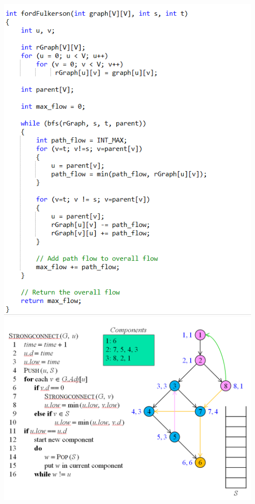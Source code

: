 \documentclass[a4paper, landscape, 8pt]{article}
\begin{document}
\includegraphics[]{MaximumFlow-2} \clearpage
\includegraphics[]{StrongConnect} \clearpage
\end{document}
